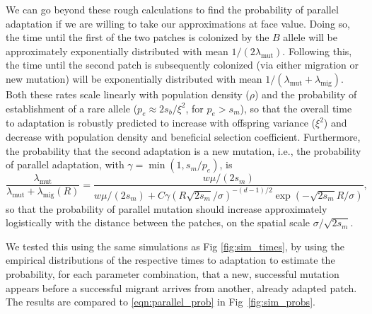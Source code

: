 \documentclass{article}
\newcommand{\revpoint}[2]{}
\newcommand{\migrate}{\lambda_\text{mig}}
\newcommand{\mutrate}{\lambda_\text{mut}}
\begin{document}
We can go beyond these rough calculations to find
the probability of parallel adaptation if we are willing to take our approximations at face value. 
Doing so, the time until the first of the two patches is colonized by the $B$
allele will be approximately exponentially distributed with mean $1/(2
\mutrate)$.
Following this, the time until the second patch is subsequently colonized 
(via either migration or new mutation) 
will be exponentially distributed with mean $1/(\mutrate+\migrate)$.
Both these rates scale linearly with population density ($\rho$) 
and the probability of establishment of a rare allele ($p_e\approx 2 s_b/\xi^2$, for $p_e>s_m$),
so that the overall time to adaptation is robustly predicted to increase with offspring variance ($\xi^2$)
and decrease with population density and beneficial selection coefficient.
Furthermore, the probability that the second adaptation is a new mutation,
i.e., the probability of parallel adaptation, 
with $\gamma = \min(1,s_m/p_e)$,
is 
\begin{equation} \label{eqn:parallel_prob}
    \frac{\mutrate}{\mutrate+\migrate(R)} = \frac{ w \mu / (2s_m) }{ w \mu / (2s_m) + C \gamma \left(R \sqrt{2 s_m} /\sigma \right)^{-(d-1)/2}\exp\left(- \sqrt{2 s_m} R / \sigma \right) },  
\end{equation}
so that the probability of parallel mutation should increase
approximately logistically with the distance between the patches, on the spatial scale $\sigma/\sqrt{2 s_m}$. \revpoint{2}{13}

We tested this using the same simulations as Fig \ref{fig:sim_times},
by using the empirical distributions of the respective times to adaptation
to estimate the probability,
for each parameter combination,
that a new, successful mutation appears 
before a successful migrant arrives from another, already adapted patch.
The results are compared to \eqref{eqn:parallel_prob}
in Fig~\ref{fig:sim_probs}.
\end{document}

